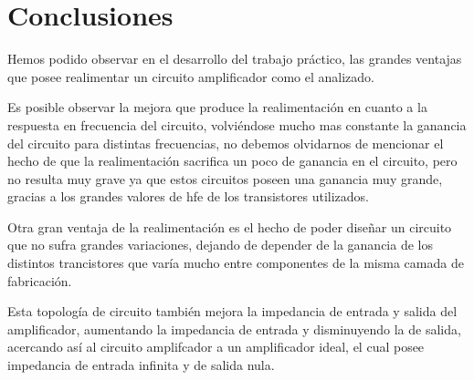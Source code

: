 \documentclass[12pt]{article}
\begin{document}
\section{Conclusiones}
Hemos podido observar en el desarrollo del trabajo práctico, las grandes ventajas que posee realimentar un circuito amplificador como el analizado.

Es posible observar la mejora que produce la realimentación en cuanto a la respuesta en frecuencia del circuito, volviéndose mucho mas constante la ganancia del circuito para distintas frecuencias, no debemos olvidarnos de mencionar el hecho de que la realimentación sacrifica un poco de ganancia en el circuito, pero no resulta muy grave ya que estos circuitos poseen una ganancia muy grande, gracias a los grandes valores de hfe de los transistores utilizados.

Otra gran ventaja de la realimentación es el hecho de poder diseñar un circuito que no sufra grandes variaciones, dejando de depender de la ganancia de los distintos trancistores que varía mucho entre componentes de la misma camada de fabricación.

Esta topología de circuito también mejora la impedancia de entrada y salida del amplificador, aumentando la impedancia de entrada y disminuyendo la de salida, acercando así al circuito amplifcador a un amplificador ideal, el cual posee impedancia de entrada infinita y de salida nula. 
\end{document}
